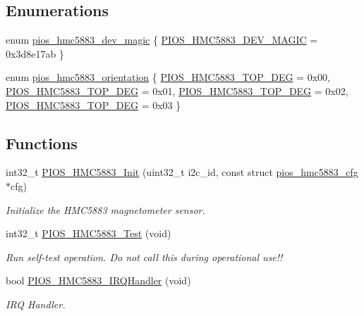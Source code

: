\subsection*{\-Enumerations}
\begin{DoxyCompactItemize}
\item 
enum \hyperlink{group___p_i_o_s___h_m_c5883_ga694f4a1224c19ea7205e8865132bc4c8}{pios\-\_\-hmc5883\-\_\-dev\-\_\-magic} \{ \hyperlink{group___p_i_o_s___h_m_c5883_gga694f4a1224c19ea7205e8865132bc4c8a8a6521f0bc2fd12e7b8b34562bfa845c}{\-P\-I\-O\-S\-\_\-\-H\-M\-C5883\-\_\-\-D\-E\-V\-\_\-\-M\-A\-G\-I\-C} =  0x3d8e17ab
 \}
\item 
enum \hyperlink{group___p_i_o_s___h_m_c5883_ga9b5f48f8223effbfd7dbb15297957119}{pios\-\_\-hmc5883\-\_\-orientation} \{ \hyperlink{group___p_i_o_s___h_m_c5883_gga9b5f48f8223effbfd7dbb15297957119a6453f9d33a17899b4d4f764ee3db4edb}{\-P\-I\-O\-S\-\_\-\-H\-M\-C5883\-\_\-\-T\-O\-P\-\_\-D\-E\-G} =  0x00, 
\hyperlink{group___p_i_o_s___h_m_c5883_gga9b5f48f8223effbfd7dbb15297957119ac6e8b95b0acf44c225caf2898d1cb353}{\-P\-I\-O\-S\-\_\-\-H\-M\-C5883\-\_\-\-T\-O\-P\-\_\-D\-E\-G} =  0x01, 
\hyperlink{group___p_i_o_s___h_m_c5883_gga9b5f48f8223effbfd7dbb15297957119a0ff7330505c4d6f75c01c41dfdaf4400}{\-P\-I\-O\-S\-\_\-\-H\-M\-C5883\-\_\-\-T\-O\-P\-\_\-D\-E\-G} =  0x02, 
\hyperlink{group___p_i_o_s___h_m_c5883_gga9b5f48f8223effbfd7dbb15297957119af9a84c032f0ee432f8969eacd4fff3bf}{\-P\-I\-O\-S\-\_\-\-H\-M\-C5883\-\_\-\-T\-O\-P\-\_\-D\-E\-G} =  0x03
 \}
\end{DoxyCompactItemize}
\subsection*{\-Functions}
\begin{DoxyCompactItemize}
\item 
int32\-\_\-t \hyperlink{group___p_i_o_s___h_m_c5883_ga2de33c0ac02b42cb114d9af689101498}{\-P\-I\-O\-S\-\_\-\-H\-M\-C5883\-\_\-\-Init} (uint32\-\_\-t i2c\-\_\-id, const struct \hyperlink{structpios__hmc5883__cfg}{pios\-\_\-hmc5883\-\_\-cfg} $\ast$cfg)
\begin{DoxyCompactList}\small\item\em \-Initialize the \-H\-M\-C5883 magnetometer sensor. \end{DoxyCompactList}\item 
int32\-\_\-t \hyperlink{group___p_i_o_s___h_m_c5883_gacea6145300c5c975b46bca1acfe800bf}{\-P\-I\-O\-S\-\_\-\-H\-M\-C5883\-\_\-\-Test} (void)
\begin{DoxyCompactList}\small\item\em \-Run self-\/test operation. \-Do not call this during operational use!! \end{DoxyCompactList}\item 
bool \hyperlink{group___p_i_o_s___h_m_c5883_ga418c7eecd061766bac016b522b593fc2}{\-P\-I\-O\-S\-\_\-\-H\-M\-C5883\-\_\-\-I\-R\-Q\-Handler} (void)
\begin{DoxyCompactList}\small\item\em \-I\-R\-Q \-Handler. \end{DoxyCompactList}\end{DoxyCompactItemize}


